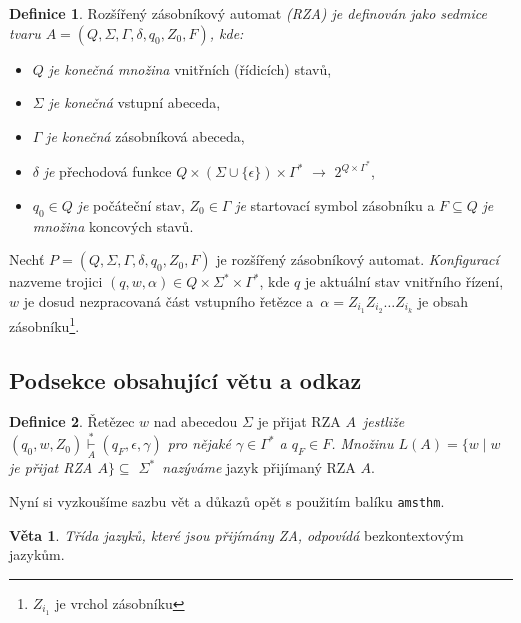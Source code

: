 \documentclass[a4paper, 11pt, twocolumn]{article}
\theoremstyle{definition}
\newtheorem{definition}{Definice}[]
\newtheorem{sentence}{Věta}[]
\begin{document}
  \begin{definition}
    \label{definicia1}
    Rozšířený zásobníkový automat \emph{(RZA) je definován jako sedmice tvaru $A = (Q, \Sigma, \Gamma, \delta, q_0, Z_0, F)$, kde:}
    \renewcommand\labelitemi{$\bullet$}
    \begin{itemize}
      \item $Q$ \emph{je konečná množina} vnitřních (řídicích) stavů,
      \item $\Sigma$ \emph{je konečná} vstupní abeceda,
      \item $\Gamma$ \emph{je konečná} zásobníková abeceda,
      \item $\delta$ \emph{je} přechodová funkce $Q \times(\Sigma\cup\{\epsilon\})\times\Gamma^{\ast}$ $\rightarrow$ $2^{{Q \times\Gamma}^{\ast}}$,
      \item $q_0 \in Q$ \emph{je} počáteční stav, $Z_0 \in \Gamma$ \emph{je} startovací symbol zásobníku a $F \subseteq Q$ \emph{je množina} koncových stavů.
    \end{itemize}
  \end{definition}

  Nechť \emph{$P = (Q, \Sigma, \Gamma, \delta, q_0, Z_0, F)$} je rozšířený zásobníkový automat. 
  \emph{Konfigurací} nazveme trojici \emph{$(q, w, \alpha) \in Q \times \Sigma^{\ast} \times \Gamma^{\ast}$},
  kde $q$ je aktuální stav vnitřního řízení, $w$ je dosud nezpracovaná část vstupního řetězce
  a~$\alpha = {Z_{i_1}}{Z_{i_2}}\dots{Z_{i_k}}$ je obsah zásobníku\footnote[1]{${Z_{i_1}}$ je vrchol zásobníku}.

  \subsection{Podsekce obsahující větu a odkaz}

  \begin{definition}
    \label{definicia2}
    Řetězec $w$ nad abecedou $\Sigma$ je přijat RZA \emph{$A$~jestliže $(q_0, w, Z_0) \overset{\ast}{\underset{A}{\vdash}} (q_F, \epsilon, \gamma)$  
    pro nějaké $\gamma \in \Gamma^{\ast}$ a $q_F \in F$. Množinu $L(A) = \{w \mid w$ je přijat RZA $A\} \subseteq$ $\Sigma^{\ast}$~nazýváme} jazyk přijímaný RZA $A$.
  \end{definition}

  Nyní si vyzkoušíme sazbu vět a důkazů opět s použitím balíku \texttt{amsthm}.

  \begin{sentence}
    \emph{Třída jazyků, které jsou přijímány ZA, odpovídá} bezkontextovým jazykům.
  \end{sentence}
\end{document}
